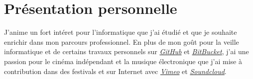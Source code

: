 \section{Présentation personnelle}
J'anime un fort intéret pour l'informatique que j'ai étudié et que je souhaite enrichir dans mon parcours professionnel. En plus de mon goût pour la veille informatique et de certains travaux personnels sur \href{https://github.com/vlnk}{\textit{GitHub}} et \href{https://bitbucket.org/vlnk}{\textit{BitBucket}}, j'ai une passion pour le cinéma indépendant et la musique électronique que j'ai mise à contribution dans des festivals et sur Internet avec \href{https://vimeo.com/user3599832}{\textit{Vimeo}} et \href{https://soundcloud.com/vlnk}{\textit{Soundcloud}}.
